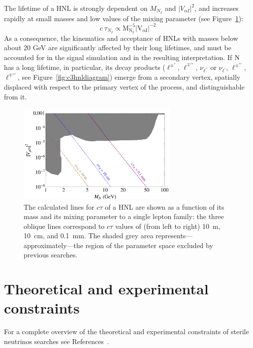 The lifetime of a HNL is strongly dependent on $M_{N_I}$ and $|V_{\alpha I}|^2$,
and increases rapidly at small masses and low values of the mixing
parameter (see Figure~\ref{fig:hnlLifetime}):
\begin{equation}
\label{eq:lifetimedependences}
c\:\tau_{N_{I}} \propto\mathrm{M_{N_I}^{-5}|V_{\alpha I}|^{-2}}
\end{equation}
As a consequence, the kinematics and acceptance of HNLs with masses
below about 20 GeV are significantly affected by their long lifetimes,
and must be accounted for in the signal simulation and in the resulting
interpretation.
If $\mathrm{N}$ has a long lifetime, in particular, its decay products
($\ell^{\pm\prime}$, $\ell^{\mp\prime\prime}$, $\nu_{\ell^{\prime\prime}}$ or
$\nu_{\ell^{\prime}}$, $\ell^{\pm\prime\prime}$, $\ell^{\mp\prime\prime}$, see Figure~\ref{fig:c3hnldiagram})
emerge from a secondary vertex, spatially displaced with respect to
the primary vertex of the process, and distinguishable from it.
\begin{figure}
\centering
\includegraphics[clip,trim=0.cm 0.1cm 0cm 0cm, width=0.7\textwidth]{Figures/c3/graph_displ.png}
\caption{The calculated lines for $c\tau$ of a HNL are shown as a function of its mass \mhnl
and its mixing parameter \mixpar to a single lepton family:
the three oblique lines correspond to $c\tau$ values of (from left to
right) 10~m,  10~cm, and 0.1~mm.
The shaded grey area represents---approximately---the region of the
parameter space excluded by previous searches.}
\label{fig:hnlLifetime}
\end{figure}


\section{Theoretical and experimental constraints} \label{sec:currentlimits}
For a complete overview of the theoretical and experimental constraints of sterile neutrinos searches see References~\cite{Deppisch_2015,10.3389/fphy.2018.00040,PhysRevD.78.013010,Drewes_2017,DREWES2017250,Antusch_2014}.


